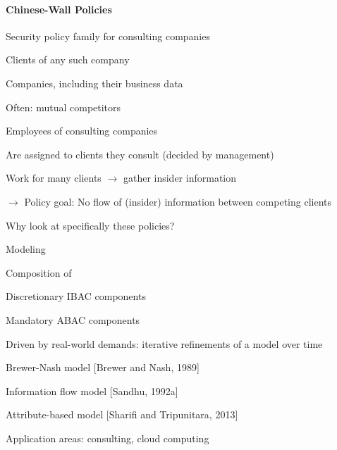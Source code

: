 \documentclass[a4paper]{article}
\begin{document}
\begin{multicols}{3}
    \paragraph{Chinese-Wall Policies}
    Security policy family for consulting companies
    \begin{itemize*}
        \item Clients of any such company
              \begin{itemize*}
                  \item Companies, including their business data
                  \item Often: mutual competitors
              \end{itemize*}
        \item Employees of consulting companies
              \begin{itemize*}
                  \item Are assigned to clients they consult (decided by management)
                  \item Work for many clients $\rightarrow$ gather insider information
              \end{itemize*}
        \item $\rightarrow$ Policy goal: No flow of (insider) information between competing clients
    \end{itemize*}

    Why look at specifically these policies?
    \begin{itemize*}
        \item Modeling
              \begin{itemize*}
                  \item Composition of
                        \begin{itemize*}
                            \item Discretionary IBAC components
                            \item Mandatory ABAC components
                        \end{itemize*}
                  \item Driven by real-world demands: iterative refinements of a model over time
                        \begin{itemize*}
                            \item Brewer-Nash model [Brewer and Nash, 1989]
                            \item Information flow model [Sandhu, 1992a]
                            \item Attribute-based model [Sharifi and Tripunitara, 2013]
                        \end{itemize*}
                  \item Application areas: consulting, cloud computing
              \end{itemize*}
    \end{itemize*}


\end{multicols}
\end{document}
